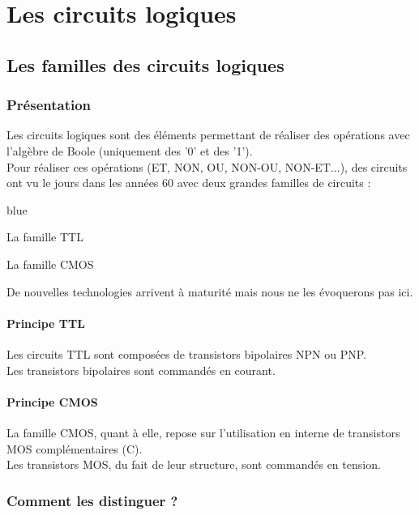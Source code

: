 \part{Les circuits logiques}
\chapter{Les familles des circuits logiques}

\section{Présentation}

Les circuits logiques sont des éléments permettant de réaliser des opérations avec l'algèbre de Boole 
(uniquement des '0' et des '1').\\
Pour réaliser ces opérations (ET, NON, OU, NON-OU, NON-ET...), des circuits ont vu le jours dans les années 60 avec deux grandes familles de circuits : \\
\begin{items}{blue}{\Triangle}
    \item La famille TTL 
    \item La famille CMOS 
\end{items} 


De nouvelles technologies arrivent à maturité mais nous ne les évoquerons pas ici.

\subsection{Principe TTL}

Les circuits TTL sont composées de transistors bipolaires NPN ou PNP. \\
Les transistors bipolaires sont commandés en courant.


\subsection{Principe CMOS}

La famille CMOS, quant à elle, repose sur l'utilisation en interne de transistors MOS complémentaires (C). \\
Les transistors MOS, du fait de leur structure, sont commandés en tension.


\section{Comment les distinguer ?}

